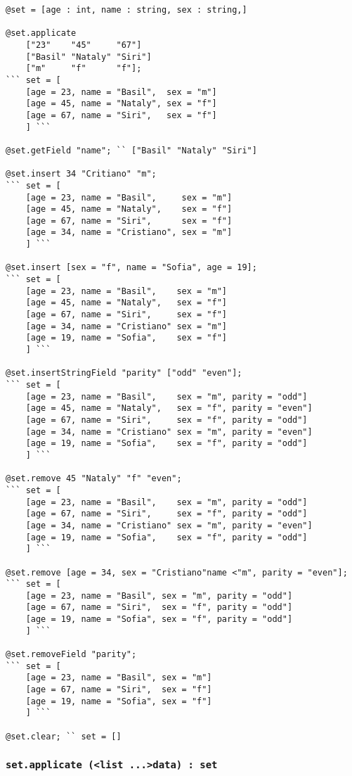 \begin{lstlisting}[caption=Методы класса set, label=setmethods]
@set = [age : int, name : string, sex : string,]

@set.applicate 
	["23"    "45"     "67"]
	["Basil" "Nataly" "Siri"]
	["m"     "f"      "f"];
``` set = [
    [age = 23, name = "Basil",  sex = "m"]
	[age = 45, name = "Nataly", sex = "f"]
	[age = 67, name = "Siri",   sex = "f"]
	] ```

@set.getField "name"; `` ["Basil" "Nataly" "Siri"]

@set.insert 34 "Critiano" "m";
``` set = [
    [age = 23, name = "Basil",     sex = "m"]
	[age = 45, name = "Nataly",    sex = "f"]
	[age = 67, name = "Siri",      sex = "f"]
	[age = 34, name = "Cristiano", sex = "m"]
	] ```

@set.insert [sex = "f", name = "Sofia", age = 19];
``` set = [
    [age = 23, name = "Basil",    sex = "m"]
	[age = 45, name = "Nataly",   sex = "f"]
	[age = 67, name = "Siri",     sex = "f"]
	[age = 34, name = "Cristiano" sex = "m"]
	[age = 19, name = "Sofia",    sex = "f"]
	] ```

@set.insertStringField "parity" ["odd" "even"];
``` set = [
    [age = 23, name = "Basil",    sex = "m", parity = "odd"]
	[age = 45, name = "Nataly",   sex = "f", parity = "even"]
	[age = 67, name = "Siri",     sex = "f", parity = "odd"]
	[age = 34, name = "Cristiano" sex = "m", parity = "even"]
	[age = 19, name = "Sofia",    sex = "f", parity = "odd"]
	] ```

@set.remove 45 "Nataly" "f" "even";
``` set = [
    [age = 23, name = "Basil",    sex = "m", parity = "odd"]
	[age = 67, name = "Siri",     sex = "f", parity = "odd"]
	[age = 34, name = "Cristiano" sex = "m", parity = "even"]
	[age = 19, name = "Sofia",    sex = "f", parity = "odd"]
	] ```

@set.remove [age = 34, sex = "Cristiano"name <"m", parity = "even"];
``` set = [
    [age = 23, name = "Basil", sex = "m", parity = "odd"]
	[age = 67, name = "Siri",  sex = "f", parity = "odd"]
	[age = 19, name = "Sofia", sex = "f", parity = "odd"]
	] ```

@set.removeField "parity";
``` set = [
    [age = 23, name = "Basil", sex = "m"]
	[age = 67, name = "Siri",  sex = "f"]
	[age = 19, name = "Sofia", sex = "f"]
	] ```

@set.clear; `` set = []
\end{lstlisting}

\subsubsection{\lstinline|set.applicate (<list ...>data) : set|}


